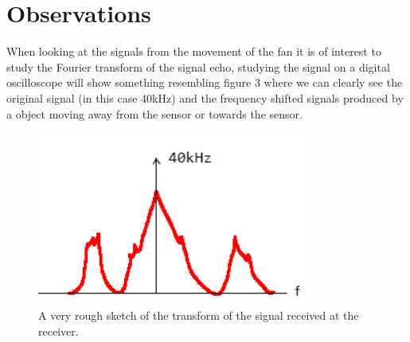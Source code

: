 \documentclass[a4paper,11pt]{article}
\begin{document}
\section{Observations}
When looking at the signals from the movement of the fan it is of interest to study the Fourier transform of the signal echo, studying the signal on a digital oscilloscope will show something resembling figure 3 where we can clearly see the original signal (in this case 40kHz) and the frequency shifted signals produced by a object moving away from the sensor or towards the sensor.
\begin{figure}[!ht]
  \centering
  \includegraphics[width=3.5in]{transform.png}
  \caption{A very rough sketch of the transform of the signal received at the receiver.}
  \label{transform}
\end{figure}
\end{document}
